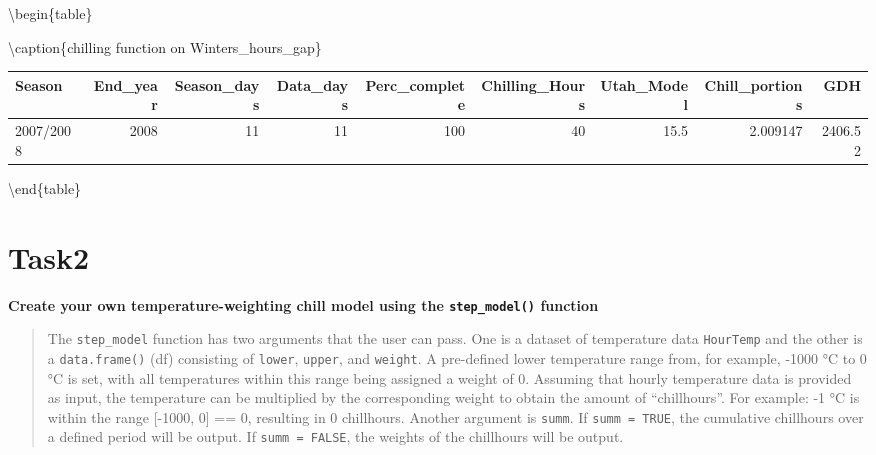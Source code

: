 \documentclass[
]{book}
\begin{document}
\textbackslash begin\{table\}

\textbackslash caption\{\label{tab:unnamed-chunk-9}chilling function on Winters\_hours\_gap\}
\centering
\fontsize{7}{9}\selectfont

\begin{tabular}[t]{l|r|r|r|r|r|r|r|r}
\hline
Season & End\_year & Season\_days & Data\_days & Perc\_complete & Chilling\_Hours & Utah\_Model & Chill\_portions & GDH\\
\hline
2007/2008 & 2008 & 11 & 11 & 100 & 40 & 15.5 & 2.009147 & 2406.52\\
\hline
\end{tabular}

\textbackslash end\{table\}

\hypertarget{task2}{%
\section{Task2}\label{task2}}

\textbf{Create your own temperature-weighting chill model using the \texttt{step\_model()} function}

\begin{quote}
The \texttt{step\_model} function has two arguments that the user can pass. One is a dataset of temperature data \texttt{HourTemp} and the other is a \texttt{data.frame()} (df) consisting of \texttt{lower}, \texttt{upper}, and \texttt{weight}. A pre-defined lower temperature range from, for example, -1000 °C to 0 °C is set, with all temperatures within this range being assigned a weight of 0. Assuming that hourly temperature data is provided as input, the
temperature can be multiplied by the corresponding weight to obtain the amount of ``chillhours''. For example: -1 °C is within the range {[}-1000, 0{]} == 0, resulting in 0 chillhours. Another argument is \texttt{summ}. If \texttt{summ\ =\ TRUE}, the cumulative chillhours over a defined period will be output. If \texttt{summ\ =\ FALSE}, the weights of the chillhours will be output.
\end{quote}
\end{document}
